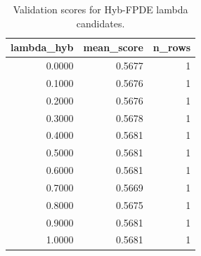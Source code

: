 \begin{table}[t]
\caption{Validation scores for Hyb-FPDE lambda candidates.}
\label{tab:lambda_distribution_computed}
\centering
\begin{tabular}{rrr}
\toprule
lambda\_hyb & mean\_score & n\_rows \\
\midrule
0.0000 & 0.5677 & 1 \\
0.1000 & 0.5676 & 1 \\
0.2000 & 0.5676 & 1 \\
0.3000 & 0.5678 & 1 \\
0.4000 & 0.5681 & 1 \\
0.5000 & 0.5681 & 1 \\
0.6000 & 0.5681 & 1 \\
0.7000 & 0.5669 & 1 \\
0.8000 & 0.5675 & 1 \\
0.9000 & 0.5681 & 1 \\
1.0000 & 0.5681 & 1 \\
\bottomrule
\end{tabular}

\end{table}
